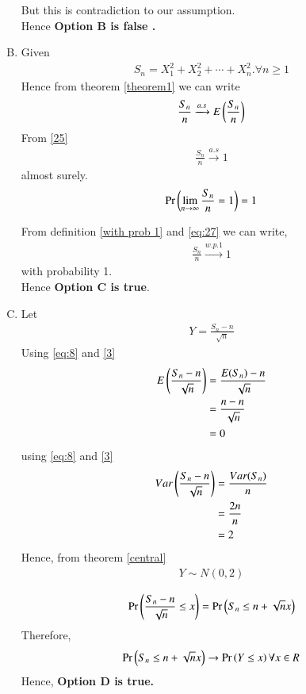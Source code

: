 \documentclass[journal,12pt,twocolumn]{IEEEtran}
\begin{document}
\begin{enumerate}[(A)]
But this is contradiction to our assumption.\\
Hence \textbf{Option B is false .}
 
 
 
 \item Given 
\begin{align}
    S_{n}=X_{1}^2+X_{2}^2+\cdots+X_{n}^2.\forall n\geq 1
\end{align}
Hence from theorem \ref{theorem1} we can write 
\begin{align}
    \frac{S_n}{n} \xrightarrow{a.s} E\left(\frac{S_n}{n}\right)
\end{align}
From \eqref{25}
\begin{align}
     \frac{S_n}{n} \xrightarrow{a.s} 1
\end{align}
almost surely.
\begin{align}
    \Pr\left(\lim_{n\to \infty}\frac{S_n}{n}=1\right)=1\label{eq:27}
\end{align}


From definition \ref{with prob 1} and \eqref{eq:27} we can write,
\begin{align}
    \frac{S_{n}}{n} \xrightarrow{w.p.1} 1
\end{align}
with probability 1.\\
Hence \textbf{Option C is true}.



\item
Let 
\begin{align}
    Y=\frac{S_{n}-n}{\sqrt{n}}
\end{align}
Using \eqref{eq:8} and \eqref{3}
\begin{align}
    E\left(\frac{S_{n}-n}{\sqrt{n}}\right)&=\frac{E(S_n)-n}{\sqrt{n}}\\
    &=\frac{n-n}{\sqrt{n}}\\
    &=0
\end{align}
using \eqref{eq:8} and \eqref{3}
\begin{align}
     Var\left(\frac{S_{n}-n}{\sqrt{n}}\right)&=\frac{Var(S_n)}{n}\\
     &=\frac{2n}{n}\\
     &=2
\end{align}
Hence, from theorem \eqref{central}
\begin{align}
    Y \sim N(0,2)\label{eq:D}
\end{align}

\begin{align}
     \Pr{\ensuremath{\left(\frac{S_{n}-n}{\sqrt{n}} \leq x\right)}}= \Pr{\ensuremath{\left(S_{n} \leq n+\sqrt{n}x\right)}}
\end{align}
Therefore,
\begin{align}
   \Pr\left(S_n \leq n+ \sqrt{n}x\right) \rightarrow \Pr\left(Y \leq x\right) \forall x \in R \label{new}
\end{align}
Hence, \textbf{Option D is true.}
 
 \end{enumerate}
    
\end{document}
